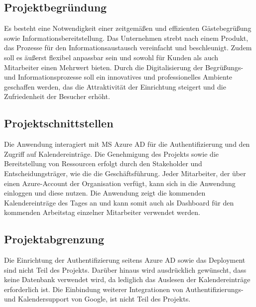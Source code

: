 \subsection{Projektbegründung} 
\label{sec:Projektbegruendung}
Es besteht eine Notwendigkeit einer zeitgemäßen und effizienten Gästebegrüßung sowie Informationsbereitstellung.
Das Unternehmen strebt nach einem Produkt, das Prozesse für den Informationsaustausch vereinfacht und beschleunigt.
Zudem soll es äußerst flexibel anpassbar sein und sowohl für Kunden als auch Mitarbeiter einen Mehrwert bieten.
Durch die Digitalisierung der Begrüßungs- und Informationsprozesse soll ein innovatives und professionelles Ambiente geschaffen werden, das die Attraktivität der Einrichtung steigert und die Zufriedenheit der Besucher erhöht.


\subsection{Projektschnittstellen} 
\label{sec:Projektschnittstellen}
Die Anwendung interagiert mit \ac{MS} Azure \ac{AD} für die Authentifizierung und den Zugriff auf Kalendereinträge.
Die Genehmigung des Projekts sowie die Bereitstellung von Ressourcen erfolgt durch den Stakeholder und Entscheidungsträger, wie \bspw die die Geschäftsführung.
Jeder Mitarbeiter, der über einen Azure-Account der Organisation verfügt, kann sich in die Anwendung einloggen und diese nutzen.
Die Anwendung zeigt die kommenden Kalendereinträge des Tages an und kann somit auch als Dashboard für den kommenden Arbeitstag einzelner Mitarbeiter verwendet werden.

\subsection{Projektabgrenzung} 
\label{sec:Projektabgrenzung}
Die Einrichtung der Authentifizierung seitens Azure \ac{AD} sowie das Deployment sind nicht Teil des Projekts.
Darüber hinaus wird ausdrücklich gewünscht, dass keine Datenbank verwendet wird, da lediglich das Auslesen der Kalendereinträge erforderlich ist.
Die Einbindung weiterer Integrationen von Authentifizierungs- und Kalendersupport von \zB Google, ist nicht Teil des Projekts.